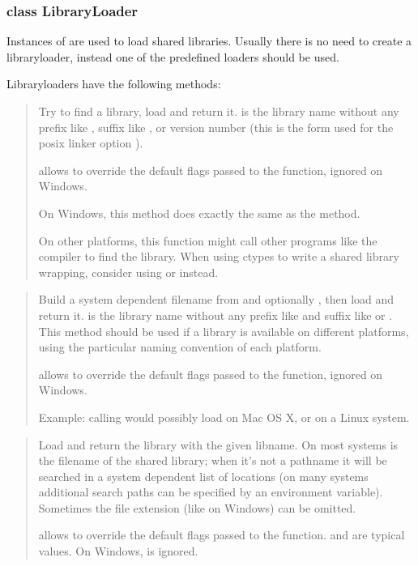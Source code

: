 \subsubsection{class LibraryLoader\label{ctypes-class-libraryloader}}

Instances of  are used to load shared libraries.
Usually there is no need to create a libraryloader, instead one of the
predefined loaders should be used.

Libraryloaders have the following methods:

\begin{quote}

Try to find a library, load and return it.   is the
library name without any prefix like , suffix like ,
 or version number (this is the form used for the posix
linker option ).

 allows to override the default flags passed to the
 function, ignored on Windows.

On Windows, this method does exactly the same as the 
method.

On other platforms, this function might call other programs like
the compiler to find the library.  When using ctypes to write a
shared library wrapping, consider using  or
 instead.
\end{quote}

\begin{quote}

Build a system dependent filename from  and optionally
, then load and return it.   is the library
name without any prefix like  and suffix like  or
.  This method should be used if a library is available
on different platforms, using the particular naming convention of
each platform.

 allows to override the default flags passed to the
 function, ignored on Windows.

Example: calling  would
possibly load  on Mac OS X, or
 on a Linux system.
\end{quote}

\begin{quote}

Load and return the library with the given libname.  On most
systems  is the filename of the shared library; when
it's not a pathname it will be searched in a system dependent list
of locations (on many systems additional search paths can be
specified by an environment variable).  Sometimes the file
extension (like  on Windows) can be omitted.

 allows to override the default flags passed to the
 function.   and  are
typical values.  On Windows,  is ignored.
\end{quote}

